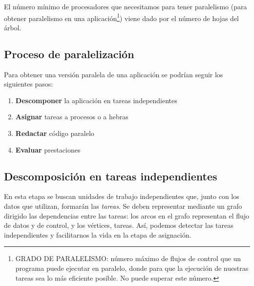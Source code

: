 \documentclass[10pt,a4paper,spanish]{report}
\begin{document}
El número mínimo de procesadores que necesitamos para tener paralelismo (para obtener paralelismo en una aplicación\footnote{GRADO DE PARALELISMO: número máximo de flujos de control que un programa puede ejecutar en paralelo, donde para que la ejecución de nuestras tareas sea lo más eficiente posible. No puede superar este número.}) viene dado por el número de hojas del árbol.

\textcolor[rgb]{0.2,0.4,0.8}{\section{Proceso de paralelización}}
Para obtener una versión paralela de una aplicación se podrían seguir los siguientes pasos:
\begin{enumerate}[\color{azul}{\bf $\heartsuit$}]
    \item \textcolor[rgb]{0.2,0.4,0.8}{\textbf{Descomponer} la aplicación en tareas independientes}
    \item \textcolor[rgb]{0.2,0.4,0.8}{\textbf{Asignar} tareas a procesos o a hebras}
    \item \textcolor[rgb]{0.2,0.4,0.8}{\textbf{Redactar} código paralelo}
    \item \textcolor[rgb]{0.2,0.4,0.8}{\textbf{Evaluar} prestaciones}
\end{enumerate}

\textcolor[rgb]{0.2,0.4,0.8}{\subsection{Descomposición en tareas independientes}}
En esta etapa se buscan unidades de trabajo independientes que, junto con los datos que utilizan, formarán las \textit{\textcolor[rgb]{0.2,0.4,0.8}{tareas}}. Se deben representar mediante un grafo dirigido las dependencias entre las tareas: los arcos en el grafo representan el flujo de datos y de control, y los vértices, tareas. Así, podemos detectar las tareas independientes y facilitarnos la vida en la etapa de asignación.
\end{document}
